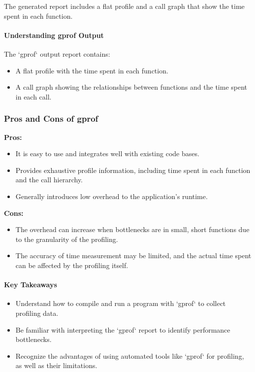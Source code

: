 \documentclass[12pt]{article}
\begin{document}
The generated report includes a flat profile and a call graph that show the time spent in each function.

\paragraph{Understanding gprof Output}
The `gprof` output report contains:
\begin{itemize}
    \item A flat profile with the time spent in each function.
    \item A call graph showing the relationships between functions and the time spent in each call.
\end{itemize}

\subsubsection{Pros and Cons of gprof}
\textbf{Pros:}
\begin{itemize}
    \item It is easy to use and integrates well with existing code bases.
    \item Provides exhaustive profile information, including time spent in each function and the call hierarchy.
    \item Generally introduces low overhead to the application's runtime.
\end{itemize}

\textbf{Cons:}
\begin{itemize}
    \item The overhead can increase when bottlenecks are in small, short functions due to the granularity of the profiling.
    \item The accuracy of time measurement may be limited, and the actual time spent can be affected by the profiling itself.
\end{itemize}

\paragraph{Key Takeaways}
\begin{itemize}
    \item Understand how to compile and run a program with `gprof` to collect profiling data.
    \item Be familiar with interpreting the `gprof` report to identify performance bottlenecks.
    \item Recognize the advantages of using automated tools like `gprof` for profiling, as well as their limitations.
\end{itemize}
\end{document}
